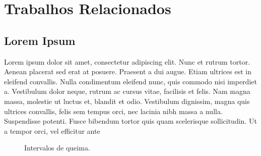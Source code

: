 \chapter{Trabalhos Relacionados}
\label{chap2}

\section{Lorem Ipsum}

Lorem ipsum dolor sit amet, consectetur adipiscing elit. Nunc et rutrum tortor. Aenean placerat sed erat at posuere. Praesent a dui augue. Etiam ultrices est in eleifend convallis. Nulla condimentum eleifend nunc, quis commodo nisi imperdiet a. Vestibulum dolor neque, rutrum ac cursus vitae, facilisis et felis. Nam magna massa, molestie ut luctus et, blandit et odio. Vestibulum dignissim, magna quis ultrices convallis, felis sem tempus orci, nec lacinia nibh massa a nulla. Suspendisse potenti. Fusce bibendum tortor quis quam scelerisque sollicitudin. Ut a tempor orci, vel efficitur ante

\begin{figure}[H]
  \centering
  \label{chap2:timeline}
  \caption{Intervalos de queima.}  
  \end{figure}

